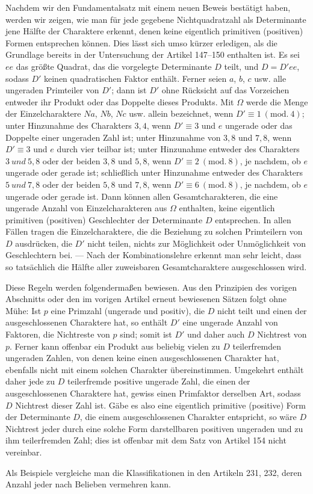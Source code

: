 Nachdem wir den Fundamentalsatz mit einem neuen Beweis bestätigt haben, werden wir zeigen, wie man für jede gegebene Nichtquadratzahl als Determinante jene Hälfte der Charaktere erkennt, denen keine eigentlich primitiven (positiven) Formen entsprechen können. Dies lässt sich umso kürzer erledigen, als die Grundlage bereits in der Untersuchung der Artikel 147--150 enthalten ist. Es sei $ee$ das größte Quadrat, das die vorgelegte Determinante $D$ teilt, und $D=D'ee$, sodass $D'$ keinen quadratischen Faktor enthält. Ferner seien $a$, $b$, $c$ usw. alle ungeraden Primteiler von $D'$; dann ist $D'$ ohne Rücksicht auf das Vorzeichen entweder ihr Produkt oder das Doppelte dieses Produkts. Mit $\Omega$ werde die Menge der Einzelcharaktere $Na$, $Nb$, $Nc$ usw. allein bezeichnet, wenn $D'\equiv1\ (\mathrm{mod.}\ 4)$; unter Hinzunahme des Charakters $3,4$, wenn $D'\equiv3$ und $e$ ungerade oder das Doppelte einer ungeraden Zahl ist; unter Hinzunahme von $3,8$ und $7,8$, wenn $D'\equiv3$ und $e$ durch vier teilbar ist; unter Hinzunahme entweder des Charakters $3\ \mathit{und}\ 5,8$ oder der beiden $3,8$ und $5,8$, wenn $D'\equiv2\ (\mathrm{mod.}\ 8)$, je nachdem, ob $e$ ungerade oder gerade ist; schließlich unter Hinzunahme entweder des Charakters $5\ \mathit{und}\ 7,8$ oder der beiden $5,8$ und $7,8$, wenn $D'\equiv6\ (\mathrm{mod.}\ 8)$, je nachdem, ob $e$ ungerade oder gerade ist. Dann können allen Gesamtcharakteren, die eine ungerade Anzahl von Einzelcharakteren aus $\Omega$ enthalten, keine eigentlich primitiven (positiven) Geschlechter der Determinante $D$ entsprechen. In allen Fällen tragen die Einzelcharaktere, die die Beziehung zu solchen Primteilern von $D$ ausdrücken, die $D'$ nicht teilen, nichts zur Möglichkeit oder Unmöglichkeit von Geschlechtern bei. --- Nach der Kombinationslehre erkennt man sehr leicht, dass so tatsächlich die Hälfte aller zuweisbaren Gesamtcharaktere ausgeschlossen wird.

Diese Regeln werden folgendermaßen bewiesen. Aus den Prinzipien des vorigen Abschnitts oder den im vorigen Artikel erneut bewiesenen Sätzen folgt ohne Mühe: Ist $p$ eine Primzahl (ungerade und positiv), die $D$ nicht teilt und einen der ausgeschlossenen Charaktere hat, so enthält $D'$ eine ungerade Anzahl von Faktoren, die Nichtreste von $p$ sind; somit ist $D'$ und daher auch $D$ Nichtrest von $p$. Ferner kann offenbar ein Produkt aus beliebig vielen zu $D$ teilerfremden ungeraden Zahlen, von denen keine einen ausgeschlossenen Charakter hat, ebenfalls nicht mit einem solchen Charakter übereinstimmen. Umgekehrt enthält daher jede zu $D$ teilerfremde positive ungerade Zahl, die einen der ausgeschlossenen Charaktere hat, gewiss einen Primfaktor derselben Art, sodass $D$ Nichtrest dieser Zahl ist. Gäbe es also eine eigentlich primitive (positive) Form der Determinante $D$, die einem ausgeschlossenen Charakter entspricht, so wäre $D$ Nichtrest jeder durch eine solche Form darstellbaren positiven ungeraden und zu ihm teilerfremden Zahl; dies ist offenbar mit dem Satz von Artikel 154 nicht vereinbar.

Als Beispiele vergleiche man die Klassifikationen in den Artikeln 231, 232, deren Anzahl jeder nach Belieben vermehren kann.
